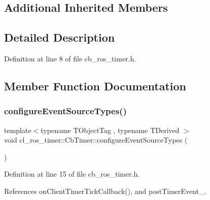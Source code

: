 \subsection*{Additional Inherited Members}


\subsection{Detailed Description}


Definition at line 8 of file cb\+\_\+ros\+\_\+timer.\+h.



\subsection{Member Function Documentation}
\mbox{\label{classcl__ros__timer_1_1CbTimer_a09267b38fed9b6db637eba8b2f789d1c}} 
\subsubsection{\texorpdfstring{configure\+Event\+Source\+Types()}{configureEventSourceTypes()}}
{\footnotesize\ttfamily template$<$typename T\+Object\+Tag , typename T\+Derived $>$ \\
void cl\+\_\+ros\+\_\+timer\+::\+Cb\+Timer\+::configure\+Event\+Source\+Types (\begin{DoxyParamCaption}{ }\end{DoxyParamCaption})\hspace{0.3cm}{\ttfamily [inline]}}



Definition at line 15 of file cb\+\_\+ros\+\_\+timer.\+h.



References on\+Client\+Timer\+Tick\+Callback(), and post\+Timer\+Event\+\_\+.


